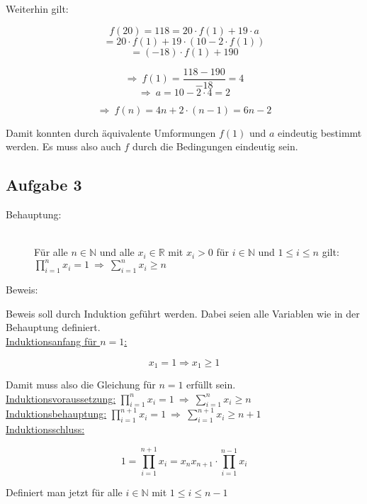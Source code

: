 \documentclass[11pt, a4paper]{article}
\begin{document}
		Weiterhin gilt:

		\[ f(20) = 118 = 20\cdot f(1) + 19\cdot a \]
		\[ = 20\cdot f(1) + 19\cdot (10 - 2\cdot f(1)) \]
		\[ = (-18)\cdot f(1) + 190 \]


		\[ \Rightarrow \ f(1) = \dfrac{118-190}{-18} = 4 \]
		\[ \Rightarrow \ a = 10 - 2\cdot 4 = 2 \]


		\[ \Rightarrow \ f(n) = 4n + 2\cdot (n-1) = 6n - 2 \]

		Damit konnten durch äquivalente Umformungen $f(1)$ und $a$ eindeutig bestimmt werden. Es muss also auch $f$ durch die Bedingungen eindeutig sein.


	\newpage

	\subsection*{Aufgabe 3}


		\begin{description}
			\item[Behauptung:]\hfill \\
				Für alle $n \in \mathbb{N}$ und alle $x_i \in \mathbb{R}$ mit $x_i > 0$ für $i \in \mathbb{N}$ und $1\leq i \leq n$ gilt: \\
				$\prod_{i=1}^n x_i = 1 \ \Longrightarrow \ \sum_{i=1}^n x_i \geq n$ \hfill
			\item[Beweis:]
		\end{description}

		Beweis soll durch Induktion geführt werden. Dabei seien alle Variablen wie in der Behauptung definiert.\\

		\underline{Induktionsanfang für $n=1$:}

			\[ x_1 = 1 \Rightarrow x_1 \geq 1 \]

			Damit muss also die Gleichung für $n=1$ erfüllt sein.\\

		\underline{Induktionsvoraussetzung:} $\prod_{i=1}^n x_i = 1 \ \Longrightarrow \ \sum_{i=1}^n x_i \geq n$\\


		\underline{Induktionsbehauptung:} $\prod_{i=1}^{n+1} x_i = 1 \ \Longrightarrow \ \sum_{i=1}^{n+1} x_i \geq n+1$ \\


		\underline{Induktionsschluss:}

		\[ 1 = \prod_{i=1}^{n+1} x_i = x_nx_{n+1}\cdot \prod_{i=1}^{n-1} x_i \]

		Definiert man jetzt für alle $i \in \mathbb{N}$ mit $1 \leq i \leq n-1$
\end{document}
